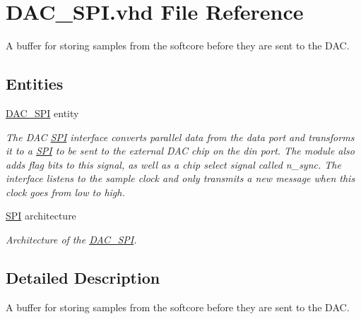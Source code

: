 \hypertarget{DAC__SPI_8vhd}{\section{D\-A\-C\-\_\-\-S\-P\-I.\-vhd File Reference}
\label{DAC__SPI_8vhd}
}


A buffer for storing samples from the softcore before they are sent to the D\-A\-C.  


\subsection*{Entities}
\begin{DoxyCompactItemize}
\item 
\hyperlink{classDAC__SPI}{D\-A\-C\-\_\-\-S\-P\-I} entity
\begin{DoxyCompactList}\small\item\em The D\-A\-C \hyperlink{classDAC__SPI_1_1SPI}{S\-P\-I} interface converts parallel data from the data port and transforms it to a \hyperlink{classDAC__SPI_1_1SPI}{S\-P\-I} to be sent to the external D\-A\-C chip on the din port. The module also adds flag bits to this signal, as well as a chip select signal called n\-\_\-sync. The interface listens to the sample clock and only transmits a new message when this clock goes from low to high. \end{DoxyCompactList}\item 
\hyperlink{classDAC__SPI_1_1SPI}{S\-P\-I} architecture
\begin{DoxyCompactList}\small\item\em Architecture of the \hyperlink{classDAC__SPI}{D\-A\-C\-\_\-\-S\-P\-I}. \end{DoxyCompactList}\end{DoxyCompactItemize}


\subsection{Detailed Description}
A buffer for storing samples from the softcore before they are sent to the D\-A\-C. 
